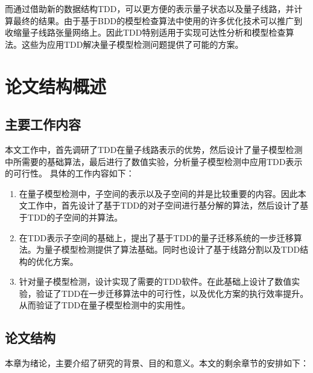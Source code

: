 而通过借助新的数据结构TDD，可以更方便的表示量子状态以及量子线路，并计算最终的结果。由于基于BDD的模型检查算法中使用的许多优化技术可以推广到收缩量子线路张量网络上\citep{Chaki_2018}。因此TDD特别适用于实现可达性分析和模型检查算法。这些为应用TDD解决量子模型检测问题提供了可能的方案。
\section{论文结构概述}

\subsection*{主要工作内容}
本文工作中，首先调研了TDD在量子线路表示的优势，然后设计了量子模型检测中所需要的基础算法，最后进行了数值实验，分析量子模型检测中应用TDD表示的可行性。
具体的工作内容如下：
\begin{enumerate}
    \item 在量子模型检测中，子空间的表示以及子空间的并是比较重要的内容。因此本文工作中，首先设计了基于TDD的对子空间进行基分解的算法，然后设计了基于TDD的子空间的并算法。
    \item 
    在TDD表示子空间的基础上，提出了基于TDD的量子迁移系统的一步迁移算法。为量子模型检测提供了算法基础。同时也设计了基于线路分割以及TDD结构的优化方案。
    \item 针对量子模型检测，设计实现了需要的TDD软件。在此基础上设计了数值实验，验证了TDD在一步迁移算法中的可行性，以及优化方案的执行效率提升。从而验证了TDD在量子模型检测中的实用性。
\end{enumerate}

\subsection*{论文结构}
本章为绪论，主要介绍了研究的背景、目的和意义。本文的剩余章节的安排如下：

